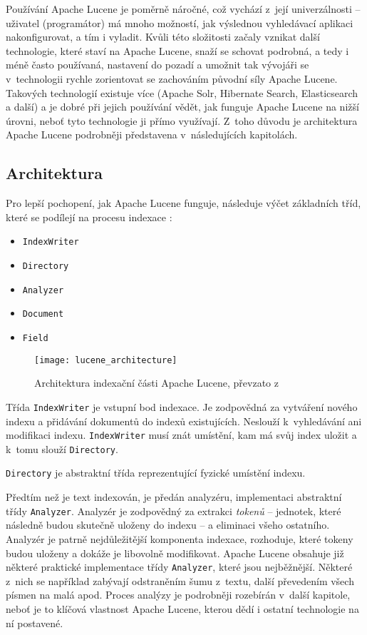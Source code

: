 \documentclass[11pt,oneside]{fithesis2}
\begin{document}
Používání Apache Lucene je poměrně náročné, což vychází z~její univerzálnosti \cite{ElasticsearchDefinitiveGuide}  -- uživatel (programátor) má mnoho možností, jak výslednou vyhledávací aplikaci nakonfigurovat, a tím i vyladit. Kvůli této složitosti začaly vznikat další technologie, které staví na Apache Lucene, snaží se schovat podrobná, a tedy i méně často používaná, nastavení do pozadí a umožnit tak vývojáři se v~technologii rychle zorientovat se zachováním původní síly Apache Lucene. Takových technologií existuje více (Apache Solr, Hibernate Search, Elasticsearch a další) a je dobré při jejich používání vědět, jak funguje Apache Lucene na nižší úrovni, neboť tyto technologie ji přímo využívají. Z~toho důvodu je architektura Apache Lucene podrobněji představena v~následujících kapitolách.

\subsection{Architektura}
Pro lepší pochopení, jak Apache Lucene funguje, následuje výčet základních tříd, které se podílejí na procesu indexace \cite[s.~26]{LuceneAction}:
\begin{itemize}
	\item \texttt{IndexWriter}
	\item \texttt{Directory}
	\item \texttt{Analyzer}
	\item \texttt{Document}
	\item \texttt{Field}
\end{itemize}

\begin{figure}[htp]
	\begin{center}
		\texttt{[image: lucene\_architecture]}
	\end{center}
	\caption{Architektura indexační části Apache Lucene, převzato z~\cite[s.~26]{LuceneAction}}	
\end{figure}

Třída \texttt{IndexWriter} je vstupní bod indexace. Je zodpovědná za vytváření nového indexu a přidávání dokumentů do indexů existujících. Neslouží k~vyhledávání ani modifikaci indexu. \texttt{IndexWriter} musí znát umístění, kam má svůj index uložit a k~tomu slouží \texttt{Directory}. 

\texttt{Directory} je abstraktní třída reprezentující fyzické umístění indexu.  

Předtím než je text indexován, je předán analyzéru, implementaci abstraktní třídy \texttt{Analyzer}. Analyzér je zodpovědný za extrakci \emph{tokenů} -- jednotek, které následně budou skutečně uloženy do indexu \cite[s.~116]{LuceneAction} -- a eliminaci všeho ostatního. Analyzér je patrně nejdůležitější komponenta indexace, rozhoduje, které tokeny budou uloženy a dokáže je libovolně modifikovat. Apache Lucene obsahuje již některé praktické implementace třídy \texttt{Analyzer}, které jsou nejběžnější. Některé z~nich  se například zabývají odstraněním šumu z~textu, další převedením všech písmen na malá apod. Proces analýzy je podrobněji rozebírán v~další kapitole, neboť je to klíčová vlastnost Apache Lucene, kterou dědí i ostatní technologie na ní postavené.
\end{document}
